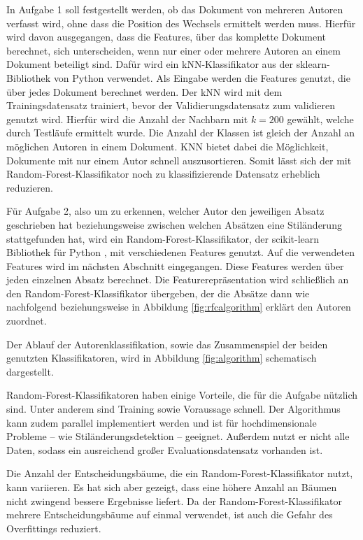 \documentclass[conference]{IEEEtran}
\begin{document}
	
	In Aufgabe 1 soll festgestellt werden, ob das Dokument von mehreren Autoren verfasst wird, ohne dass die Position des Wechsels ermittelt werden muss. Hierfür wird davon ausgegangen, dass die Features, über das komplette Dokument berechnet, sich unterscheiden, wenn nur einer oder mehrere Autoren an einem Dokument beteiligt sind. Dafür wird ein kNN-Klassifikator aus der sklearn-Bibliothek \cite{ma_b1} von Python verwendet. Als Eingabe werden die Features genutzt, die über jedes Dokument berechnet werden. Der kNN wird mit dem Trainingsdatensatz trainiert, bevor der Validierungsdatensatz zum validieren genutzt wird. Hierfür wird die Anzahl der Nachbarn mit $k=200$ gewählt, welche durch Testläufe ermittelt wurde. Die Anzahl der Klassen ist gleich der Anzahl an möglichen Autoren in einem Dokument. 
	KNN bietet dabei die Möglichkeit, Dokumente mit nur einem Autor schnell auszusortieren. Somit lässt sich der mit Random-Forest-Klassifikator noch zu klassifizierende Datensatz erheblich reduzieren.
	
	
	Für Aufgabe 2, also um zu erkennen, welcher Autor den jeweiligen Absatz geschrieben hat beziehungsweise zwischen welchen Absätzen eine Stiländerung stattgefunden hat, wird ein Random-Forest-Klassifikator, der scikit-learn Bibliothek für Python \cite{ma_b1}, mit verschiedenen Features genutzt. Auf die verwendeten Features wird im nächsten Abschnitt eingegangen. Diese Features werden über jeden einzelnen Absatz berechnet. Die Featurerepräsentation wird schließlich an den Random-Forest-Klassifikator übergeben, der die Absätze dann wie nachfolgend beziehungsweise in Abbildung \ref{fig:rfcalgorithm} erklärt den Autoren zuordnet.
	
	Der Ablauf der Autorenklassifikation, sowie das Zusammenspiel der beiden genutzten Klassifikatoren, wird in Abbildung \ref{fig:algorithm} schematisch dargestellt.
	
	Random-Forest-Klassifikatoren haben einige Vorteile, die für die Aufgabe nützlich sind. Unter anderem sind Training sowie Voraussage schnell. Der Algorithmus kann zudem parallel implementiert werden und ist für hochdimensionale Probleme – wie Stiländerungsdetektion – geeignet. \cite{ma_b2} Außerdem nutzt er nicht alle Daten, sodass ein ausreichend großer Evaluationsdatensatz vorhanden ist.
	
	Die Anzahl der Entscheidungsbäume, die ein Random-Forest-Klassifikator nutzt, kann variieren. Es hat sich aber gezeigt, dass eine höhere Anzahl an Bäumen nicht zwingend bessere Ergebnisse liefert. Da der Random-Forest-Klassifikator mehrere Entscheidungsbäume auf einmal verwendet, ist auch die Gefahr des Overfittings reduziert. \cite{ma_b2}
	
\end{document}
